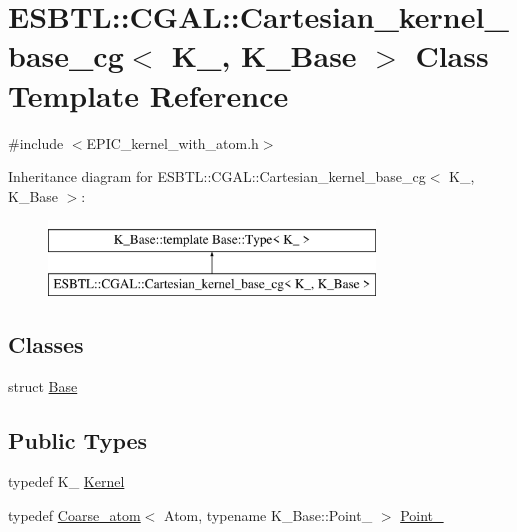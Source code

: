 \hypertarget{classESBTL_1_1CGAL_1_1Cartesian__kernel__base__cg}{}\section{E\+S\+B\+TL\+:\+:C\+G\+AL\+:\+:Cartesian\+\_\+kernel\+\_\+base\+\_\+cg$<$ K\+\_\+, K\+\_\+\+Base $>$ Class Template Reference}
\label{classESBTL_1_1CGAL_1_1Cartesian__kernel__base__cg}


{\ttfamily \#include $<$E\+P\+I\+C\+\_\+kernel\+\_\+with\+\_\+atom.\+h$>$}

Inheritance diagram for E\+S\+B\+TL\+:\+:C\+G\+AL\+:\+:Cartesian\+\_\+kernel\+\_\+base\+\_\+cg$<$ K\+\_\+, K\+\_\+\+Base $>$\+:\begin{figure}[H]
\begin{center}
\leavevmode
\includegraphics[height=2.000000cm]{classESBTL_1_1CGAL_1_1Cartesian__kernel__base__cg}
\end{center}
\end{figure}
\subsection*{Classes}
\begin{DoxyCompactItemize}
\item 
struct \hyperlink{structESBTL_1_1CGAL_1_1Cartesian__kernel__base__cg_1_1Base}{Base}
\end{DoxyCompactItemize}
\subsection*{Public Types}
\begin{DoxyCompactItemize}
\item 
typedef K\+\_\+ \hyperlink{classESBTL_1_1CGAL_1_1Cartesian__kernel__base__cg_a0e4e4792eb3643c5f639481e54d3da79}{Kernel}
\item 
typedef \hyperlink{classESBTL_1_1Coarse__atom}{Coarse\+\_\+atom}$<$ Atom, typename K\+\_\+\+Base\+::\+Point\+\_ $>$ \hyperlink{classESBTL_1_1CGAL_1_1Cartesian__kernel__base__cg_a332637869c2baa408be0c6f537f7929d}{Point\+\_}
\end{DoxyCompactItemize}


